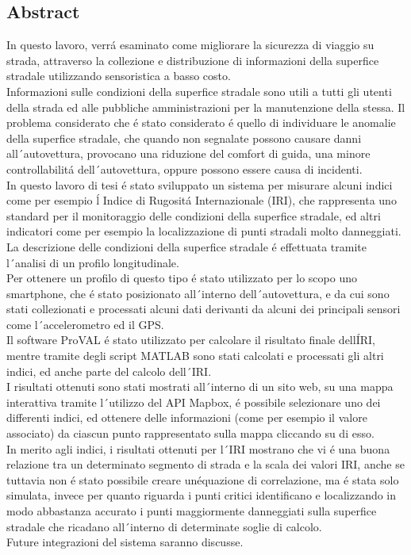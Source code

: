 \documentclass[tesi]{subfiles}
\begin{document}
\begin{flushright}
\section*{Abstract}\label{Abstract_IT}
\vspace{10mm}
\end{flushright}
\noindent In questo lavoro, verr\'a esaminato come migliorare la sicurezza di viaggio su strada, attraverso la collezione e distribuzione di informazioni della superfice stradale utilizzando sensoristica a basso costo. \\ Informazioni sulle condizioni della superfice stradale sono utili a tutti gli utenti della strada ed alle pubbliche amministrazioni per la manutenzione della stessa. 
Il problema considerato che \'e stato considerato \'e quello di individuare le anomalie della superfice stradale, che quando non segnalate possono causare danni all\'\ autovettura, provocano una riduzione del comfort di guida, una minore controllabilit\'a dell\'\ autovettura, oppure possono essere causa di incidenti.\\ In questo lavoro di tesi \'e stato sviluppato un sistema per misurare alcuni indici come per esempio \'l Indice di Rugosit\'a Internazionale (IRI), che rappresenta uno standard per il monitoraggio delle condizioni della superfice stradale, ed altri indicatori come per esempio la localizzazione di punti stradali molto danneggiati.\\La descrizione delle condizioni della superfice stradale \'e effettuata tramite l\'\ analisi di un profilo longitudinale. \\ Per ottenere un profilo di questo tipo \'e stato utilizzato per lo scopo uno smartphone, che \'e stato posizionato all\'\ interno dell\'\ autovettura, e da cui sono stati collezionati e processati alcuni dati derivanti da alcuni dei principali sensori come l\'\ accelerometro ed il GPS. \\ Il software ProVAL \'e stato utilizzato per calcolare il risultato finale dell\'IRI, mentre tramite degli script MATLAB sono stati calcolati e processati gli altri indici, ed anche parte del calcolo dell\'\ IRI. \\ I risultati ottenuti sono stati mostrati all\'\ interno di un sito web, su una mappa interattiva tramite l\'\ utilizzo del API Mapbox, \'e possibile selezionare uno dei differenti indici, ed ottenere delle informazioni (come per esempio il valore associato) da ciascun punto rappresentato sulla mappa cliccando su di esso. \\ In merito agli indici, i risultati ottenuti per l\'\ IRI mostrano che vi \'e una buona relazione tra un determinato segmento di strada e la scala dei valori IRI, anche se tuttavia non \'e stato possibile creare un\'equazione di correlazione, ma \'e stata solo simulata, invece per quanto riguarda i punti critici identificano e localizzando in modo abbastanza accurato i punti maggiormente danneggiati sulla superfice stradale che ricadano all\'\ interno di determinate soglie di calcolo.\\
Future integrazioni del sistema saranno discusse.
\clearpage
\end{document}
